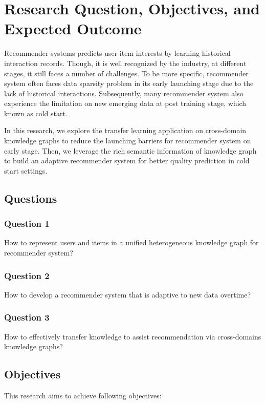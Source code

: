 
\section{Research Question, Objectives, and Expected Outcome}

Recommender systems predicts user-item interests by learning historical interaction records. Though, it is well recognized by the industry, at different stages, it still faces a number of challenges. 
To be more specific, recommender system often faces data sparsity problem in its early launching stage due to the lack of historical interactions. 
Subsequently, many recommender system also experience the limitation on new emerging data at post training stage, which known as cold start. 

In this research, we explore the transfer learning application on cross-domain knowledge graphs to reduce the launching barriers for recommender system on early stage. Then, we leverage the rich semantic information of knowledge graph to build an adaptive recommender system for better quality prediction in cold start settings. 

\subsection{Questions}

\subsubsection*{Question 1}
How to represent users and items in a unified heterogeneous knowledge graph for recommender system?

\subsubsection*{Question 2}
How to develop a recommender system that is adaptive to new data overtime?

\subsubsection*{Question 3}
How to effectively transfer knowledge to assist recommendation via cross-domains knowledge graphs?

\subsection{Objectives}
This research aims to achieve following objectives: 

